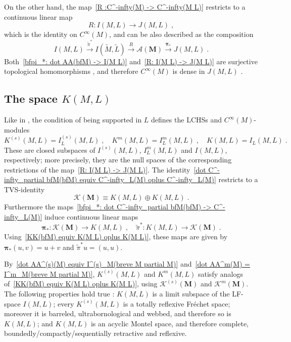 \documentclass{memo-l}
\theoremstyle{plain}
\theoremstyle{definition}
\theoremstyle{remark}
\renewcommand{\AA}{\mathcal{A}}
\newcommand{\KK}{\mathcal{K}}
\newcommand{\bfM}{\boldsymbol{M}}
\newcommand{\bfpi}{\boldsymbol{\pi}}
\numberwithin{section}{chapter}
\numberwithin{equation}{section}%
\begin{document}
On the other hand, the map~\eqref{R :C^-infty(M) -> C^-infty(M L)} restricts to a continuous linear map
\begin{equation}\label{R: I(M L) -> J(M L)}
R:I(M,L)\to J(M,L)\;,
\end{equation}
which is the identity on $C^\infty(M)$, and can be also described as the composition
\[
I(M,L) \xrightarrow{\tilde\pi^*} I(\widetilde M,\widetilde L) \xrightarrow{R} \AA(\bfM) \xrightarrow{\bfpi_*} J(M,L)\;.
\]
Both~\eqref{bfpi_*: dot AA(bfM) -> I(M L)} and~\eqref{R: I(M L) -> J(M L)} are surjective topological homomorphisms \cite[Proposition~7.29]{AlvKordyLeichtnam-conormal}, and therefore $C^\infty(M)$ is dense in $J(M,L)$ \cite[Corollary~7.32]{AlvKordyLeichtnam-conormal}.



\subsection{The space $K(M,L)$}\label{ss: K(M L)}

Like in , the condition of being supported in $L$ defines the LCHSs and $C^\infty(M)$-modules   
\[
K^{(s)}(M,L)=I^{(s)}_L(M,L)\;,\quad K^m(M,L)=I^m_L(M,L)\;,\quad K(M,L)=I_L(M,L)\;.
\]
These are closed subspaces of $I^{(s)}(M,L)$, $I^m_L(M,L)$ and $I(M,L)$, respectively; more precisely, they are the null spaces of the corresponding restrictions of the map~\eqref{R: I(M L) -> J(M L)}. The identity~\eqref{dot C^-infty_partial bfM(bfM) equiv C^-infty_L(M) oplus C^-infty_L(M)} restricts to a TVS-identity
\begin{equation}\label{KK(bfM) equiv K(M L) oplus K(M L)}
\KK(\bfM)\equiv K(M,L)\oplus K(M,L)\;.
\end{equation}
Furthermore the maps~\eqref{bfpi_*: dot C^-infty_partial bfM(bfM) -> C^-infty_L(M)} induce continuous linear maps
\begin{equation}\label{bfpi_*: KK(bfM) -> K(M L)}
\bfpi_*:\KK(\bfM)\to K(M,L)\;,\quad
\tilde\pi^*:K(M,L)\to\KK(\bfM)\;.
\end{equation}
Using~\eqref{KK(bfM) equiv K(M L) oplus K(M L)}, these maps are given by $\bfpi_*(u,v)=u+v$ and $\tilde\pi^*u=(u,u)$.

By~\eqref{dot AA^(s)(M) equiv I^(s)_M(breve M partial M)} and~\eqref{dot AA^m(M) = I^m_M(breve M partial M)}, $K^{(s)}(M,L)$ and $K^m(M,L)$ satisfy analogs of~\eqref{KK(bfM) equiv K(M L) oplus K(M L)}, using $\KK^{(s)}(\bfM)$ and $\KK^m(\bfM)$. The following properties hold true \cite[Corollaries~7.19--7.21 and~7.23]{AlvKordyLeichtnam-conormal}: $K(M,L)$ is a limit subspace of the LF-space $I(M,L)$; every $K^{(s)}(M,L)$ is a totally reflexive Fr\'echet space; moreover it is barreled, ultrabornological and webbed, and therefore so is $K(M,L)$; and $K(M,L)$ is an acyclic Montel space, and therefore complete, boundedly/compactly/sequentially retractive and reflexive.
\end{document}
